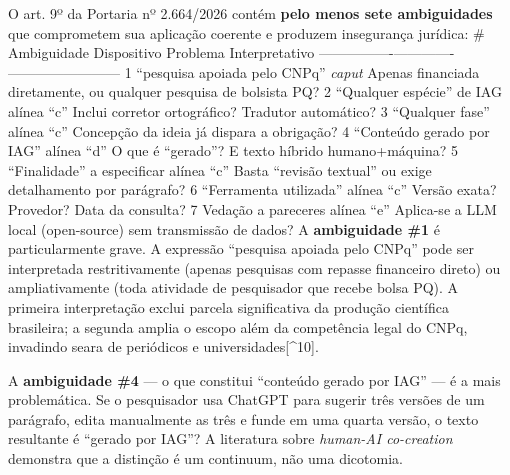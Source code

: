 \documentclass[
  12pt,
  a4paper,
  brazil
]{article}
\begin{document}
O art. 9º da Portaria nº 2.664/2026 contém \textbf{pelo menos sete
ambiguidades} que comprometem sua aplicação coerente e produzem
insegurança jurídica: \textbar{} \# \textbar{} Ambiguidade \textbar{}
Dispositivo \textbar{} Problema Interpretativo \textbar{}
\textbar---\textbar-------------\textbar-------------\textbar------------------------\textbar{}
\textbar{} 1 \textbar{} ``pesquisa apoiada pelo CNPq'' \textbar{}
\emph{caput} \textbar{} Apenas financiada diretamente, ou qualquer
pesquisa de bolsista PQ? \textbar{} \textbar{} 2 \textbar{} ``Qualquer
espécie'' de IAG \textbar{} alínea ``c'' \textbar{} Inclui corretor
ortográfico? Tradutor automático? \textbar{} \textbar{} 3 \textbar{}
``Qualquer fase'' \textbar{} alínea ``c'' \textbar{} Concepção da ideia
já dispara a obrigação? \textbar{} \textbar{} 4 \textbar{} ``Conteúdo
gerado por IAG'' \textbar{} alínea ``d'' \textbar{} O que é ``gerado''?
E texto híbrido humano+máquina? \textbar{} \textbar{} 5 \textbar{}
``Finalidade'' a especificar \textbar{} alínea ``c'' \textbar{} Basta
``revisão textual'' ou exige detalhamento por parágrafo? \textbar{}
\textbar{} 6 \textbar{} ``Ferramenta utilizada'' \textbar{} alínea ``c''
\textbar{} Versão exata? Provedor? Data da consulta? \textbar{}
\textbar{} 7 \textbar{} Vedação a pareceres \textbar{} alínea ``e''
\textbar{} Aplica-se a LLM local (open-source) sem transmissão de dados?
\textbar{} A \textbf{ambiguidade \#1} é particularmente grave. A
expressão ``pesquisa apoiada pelo CNPq'' pode ser interpretada
restritivamente (apenas pesquisas com repasse financeiro direto) ou
ampliativamente (toda atividade de pesquisador que recebe bolsa PQ). A
primeira interpretação exclui parcela significativa da produção
científica brasileira; a segunda amplia o escopo além da competência
legal do CNPq, invadindo seara de periódicos e
universidades{[}\^{}10{]}.

A \textbf{ambiguidade \#4} --- o que constitui ``conteúdo gerado por
IAG'' --- é a mais problemática. Se o pesquisador usa ChatGPT para
sugerir três versões de um parágrafo, edita manualmente as três e funde
em uma quarta versão, o texto resultante é ``gerado por IAG''? A
literatura sobre \emph{human-AI co-creation} demonstra que a distinção é
um continuum, não uma dicotomia.
\end{document}
